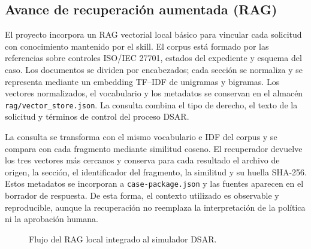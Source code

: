 \documentclass[11pt,a4paper]{article}
\begin{document}
\subsection{Avance de recuperación aumentada (RAG)}

El proyecto incorpora un RAG vectorial local básico para vincular cada solicitud con conocimiento mantenido por el skill. El corpus está formado por las referencias sobre controles ISO/IEC 27701, estados del expediente y esquema del caso. Los documentos se dividen por encabezados; cada sección se normaliza y se representa mediante un embedding TF--IDF de unigramas y bigramas. Los vectores normalizados, el vocabulario y los metadatos se conservan en el almacén \texttt{rag/vector\_store.json}. La consulta combina el tipo de derecho, el texto de la solicitud y términos de control del proceso DSAR.

La consulta se transforma con el mismo vocabulario e IDF del corpus y se compara con cada fragmento mediante similitud coseno. El recuperador devuelve los tres vectores más cercanos y conserva para cada resultado el archivo de origen, la sección, el identificador del fragmento, la similitud y su huella SHA-256. Estos metadatos se incorporan a \texttt{case-package.json} y las fuentes aparecen en el borrador de respuesta. De esta forma, el contexto utilizado es observable y reproducible, aunque la recuperación no reemplaza la interpretación de la política ni la aprobación humana.

\begin{figure}[H]
\centering
{}
\caption{Flujo del RAG local integrado al simulador DSAR.}
\label{fig:rag-flow}
\end{figure}
\end{document}
